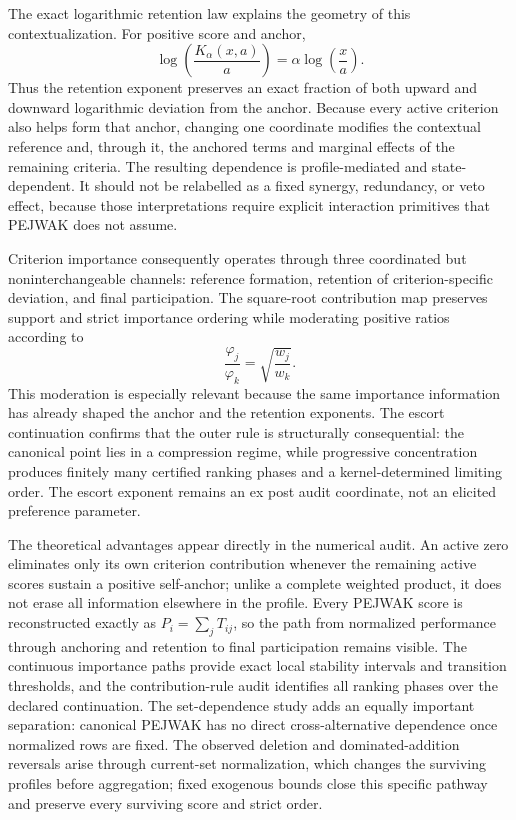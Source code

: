 \documentclass[reqno,11pt]{amsart}
\theoremstyle{definition}
\theoremstyle{plain}
\theoremstyle{remark}
\begin{document}
The exact logarithmic retention law explains the geometry of this
contextualization. For positive score and anchor,
\[
\log\!\left(\frac{K_{\alpha}(x,a)}{a}\right)
=\alpha\log\!\left(\frac{x}{a}\right).
\]
Thus the retention exponent preserves an exact fraction of both upward
and downward logarithmic deviation from the anchor. Because every active
criterion also helps form that anchor, changing one coordinate modifies
the contextual reference and, through it, the anchored terms and marginal
effects of the remaining criteria. The resulting dependence is
profile-mediated and state-dependent. It should not be relabelled as a
fixed synergy, redundancy, or veto effect, because those interpretations
require explicit interaction primitives that PEJWAK does not assume.

Criterion importance consequently operates through three coordinated but
noninterchangeable channels: reference formation, retention of
criterion-specific deviation, and final participation. The square-root
contribution map preserves support and strict importance ordering while
moderating positive ratios according to
\[
\frac{\varphi_j}{\varphi_k}=\sqrt{\frac{w_j}{w_k}}.
\]
This moderation is especially relevant because the same importance
information has already shaped the anchor and the retention exponents.
The escort continuation confirms that the outer rule is structurally
consequential: the canonical point lies in a compression regime, while
progressive concentration produces finitely many certified ranking phases
and a kernel-determined limiting order. The escort exponent remains an
ex post audit coordinate, not an elicited preference parameter.

The theoretical advantages appear directly in the numerical audit. An
active zero eliminates only its own criterion contribution whenever the
remaining active scores sustain a positive self-anchor; unlike a complete
weighted product, it does not erase all information elsewhere in the
profile. Every PEJWAK score is reconstructed exactly as
\(P_i=\sum_jT_{ij}\), so the path from normalized performance through
anchoring and retention to final participation remains visible. The
continuous importance paths provide exact local stability intervals and
transition thresholds, and the contribution-rule audit identifies all
ranking phases over the declared continuation. The set-dependence study
adds an equally important separation: canonical PEJWAK has no direct
cross-alternative dependence once normalized rows are fixed. The observed
deletion and dominated-addition reversals arise through current-set
normalization, which changes the surviving profiles before aggregation;
fixed exogenous bounds close this specific pathway and preserve every
surviving score and strict order.
\end{document}
